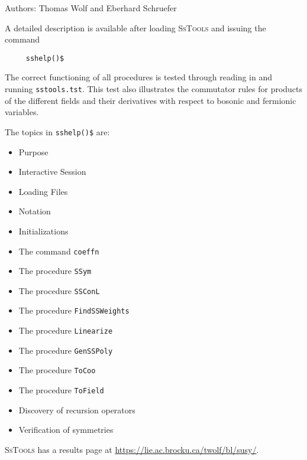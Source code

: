 
Authors: Thomas Wolf and Eberhard Schruefer


A detailed %
description is available after loading \textsc{SsTools} and issuing the command
\begin{verbatim}
     sshelp()$
\end{verbatim}
The correct functioning of all procedures is tested through
reading in and running \texttt{sstools.tst}. This test also illustrates
the commutator rules for products of the different fields and their
derivatives with respect to bosonic and fermionic variables.

The topics %
in \texttt{sshelp()\$} are:
\begin{itemize}
\item{Purpose}
\item{Interactive Session}
\item{Loading Files}
\item{Notation}
\item{Initializations}
\item{The command \texttt{coeffn}}
\item{The procedure \texttt{SSym}}
\item{The procedure \texttt{SSConL}}
\item{The procedure \texttt{FindSSWeights}}
\item{The procedure \texttt{Linearize}}
\item{The procedure \texttt{GenSSPoly}}
\item{The procedure \texttt{ToCoo}}
\item{The procedure \texttt{ToField}}
\item{Discovery of recursion operators}
\item{Verification of symmetries}
\end{itemize}

\begin{sloppypar}
  \textsc{SsTools} has a results page at
  \url{https://lie.ac.brocku.ca/twolf/bl/susy/}.
\end{sloppypar}

\newpage

